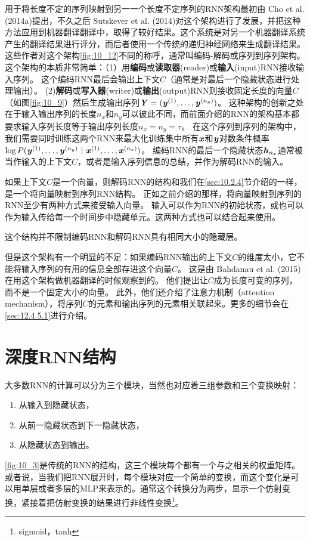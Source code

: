 用于将长度不定的序列映射到另一一个长度不定序列的RNN架构最初由 Cho et al. (2014a)提出，不久之后 Sutskever et al. (2014)对这个架构进行了发展，并把这种方法应用到机器翻译翻译中，取得了较好结果。这个系统是对另一个机器翻译系统产生的翻译结果进行评分，而后者使用一个传统的递归神经网络来生成翻译结果。
这些作者对这个架构\ref{fig:10_12}不同的称呼，通常叫编码-解码或序列到序列架构。
这个架构的本质非常简单：（1）用\textbf{编码}或\textbf{读取器}(reader)或\textbf{输入}(input)RNN接收输入序列。
这个编码RNN最后会输出上下文$C$（通常是对最后一个隐藏状态进行处理输出）。
(2)\textbf{解码}或\textbf{写入器}(writer)或\textbf{输出}(output)RNN则接收固定长度的向量$C$（如图\ref{fig:10_9}）然后生成输出序列$\boldsymbol{\mathit{Y}}=(\boldsymbol{\mathit{y}}^{(1)}, \dots, \boldsymbol{\mathit{y}}^{(n_y)})$。
这种架构的创新之处在于输入输出序列的长度$n_x$和$n_y$可以彼此不同，而前面介绍的RNN的架构基本都要求输入序列长度等于输出序列长度$n_x = n_y = \tau$。
在这个序列到序列的架构中，我们需要同时训练这两个RNN来最大化训练集中所有$\boldsymbol{\mathit{x}}$和$\boldsymbol{\mathit{y}}$对数条件概率$\log P( \boldsymbol{\mathit{y}}^{(1)}, \dots, \boldsymbol{\mathit{y}}^{(n_y)} ~|~ \boldsymbol{\mathit{x}}^{(1)},\dots,\boldsymbol{\mathit{x}}^{(n_x)} )$。
编码RNN的最后一个隐藏状态$\boldsymbol{\mathit{h}}_{n_x}$通常被当作输入的上下文$C$，或者是输入序列信息的总结，并作为解码RNN的输入。

如果上下文$C$是一个向量，则解码RNN的结构和我们在\ref{sec:10.2.4}节介绍的一样，是一个将向量映射到序列RNN结构。
正如之前介绍的那样，将向量映射到序列的RNN至少有两种方式来接受输入向量。
输入可以作为RNN的初始状态，或也可以作为输入传给每一个时间步中隐藏单元。这两种方式也可以结合起来使用。

这个结构并不限制编码RNN和解码RNN具有相同大小的隐藏层。

但是这个架构有一个明显的不足：如果编码RNN输出的上下文$C$的维度太小，它不能将输入序列的有用的信息全部存进这个向量$C$。
这是由 Bahdanau et al. (2015)在用这个架构做机器翻译的时候观察到的。
他们提出让$C$成为长度可变的序列，而不是一个固定大小的向量。
此外，他们还介绍了注意力机制（attention mechanism），将序列$C$的元素和输出序列的元素相关联起来。更多的细节会在\ref{sec:12.4.5.1}进行介绍。

\section{深度RNN结构}
\label{sec:10.5}
大多数RNN的计算可以分为三个模块，当然也对应着三组参数和三个变换映射：
\begin{enumerate}
 \item 从输入到隐藏状态，
 \item 从前一隐藏状态到下一隐藏状态，
 \item 从隐藏状态到输出。
\end{enumerate}
\ref{fig:10_3}是传统的RNN的结构，这三个模块每个都有一个与之相关的权重矩阵。或者说，当我们把RNN展开时，每个模块对应一个简单的变换，而这个变化是可以用单层或者多层的MLP来表示的。通常这个转换分为两步，显示一个仿射变换，紧接着把仿射变换的结果进行非线性变换\footnote{sigmoid，tanh}。

